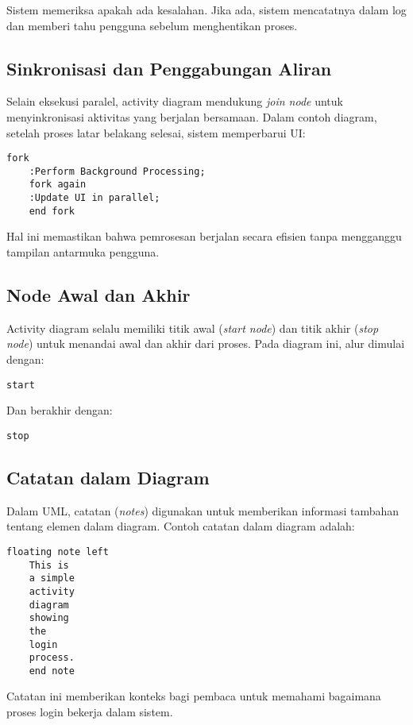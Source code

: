 Sistem memeriksa apakah ada kesalahan. Jika ada, sistem mencatatnya dalam log dan memberi tahu pengguna sebelum menghentikan proses.

\subsection{Sinkronisasi dan Penggabungan Aliran}
Selain eksekusi paralel, activity diagram mendukung \textit{join node} untuk menyinkronisasi aktivitas yang berjalan bersamaan. Dalam contoh diagram, setelah proses latar belakang selesai, sistem memperbarui UI:

\begin{lstlisting}[language=puml]
	fork
	:Perform Background Processing;
	fork again
	:Update UI in parallel;
	end fork
\end{lstlisting}

Hal ini memastikan bahwa pemrosesan berjalan secara efisien tanpa mengganggu tampilan antarmuka pengguna.

\subsection{Node Awal dan Akhir}
Activity diagram selalu memiliki titik awal (\textit{start node}) dan titik akhir (\textit{stop node}) untuk menandai awal dan akhir dari proses. Pada diagram ini, alur dimulai dengan:

\begin{lstlisting}[language=puml]
	start
\end{lstlisting}

Dan berakhir dengan:

\begin{lstlisting}[language=puml]
	stop
\end{lstlisting}

\subsection{Catatan dalam Diagram}
Dalam UML, catatan (\textit{notes}) digunakan untuk memberikan informasi tambahan tentang elemen dalam diagram. Contoh catatan dalam diagram adalah:

\begin{lstlisting}[language=puml]
	floating note left
	This is 
	a simple 
	activity 
	diagram
	showing 
	the 
	login 
	process.
	end note
\end{lstlisting}

Catatan ini memberikan konteks bagi pembaca untuk memahami bagaimana proses login bekerja dalam sistem.

